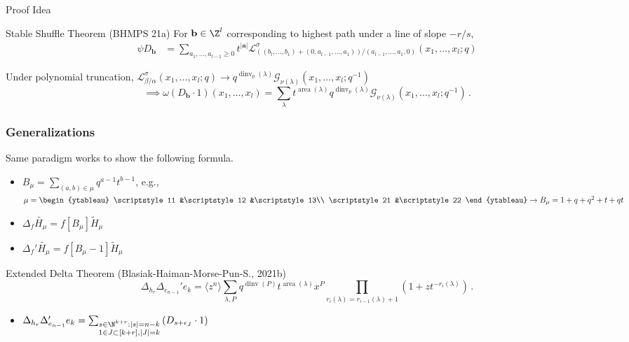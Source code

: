 \documentclass{beamer}
\DeclareMathOperator{\area}{area}
\DeclareMathOperator{\dinv}{dinv}
\newcommand{\Gcal}{\mathcal{G}}
\newcommand{\Lcal}{{\mathcal L}}
\newcommand{\bb}{{\mathbf b}}
\newcommand{\aA}{{\mathbf a}}
\newcounter{c}
\begin{document}
\begin{frame}{Proof Idea}
          \begin{block}{Stable Shuffle Theorem (BHMPS 21a)}
    For \(\bb \in \Z^l\) corresponding to highest path
    under a line of slope \(-r/s\),
    \begin{align*}
      \psi D_\bb &= \sum_{a_1,\ldots,a_{l-1} \geq 0}
t^{|\aA|} \Lcal^\sigma_{((b_l,\ldots,b_1)+(0,a_{l-1},\ldots,a_1))/(a_{l-1},\ldots,a_1,0)}(x_1,\ldots,x_l;q)
    \end{align*}
  \end{block}
    Under polynomial truncation,
  \(\Lcal^\sigma_{\beta/\alpha}(x_1,\ldots,x_l;q) \to
  q^{\dinv_p(\lambda)}\Gcal_{\nu(\lambda)}(x_1,\ldots,x_l;q^{-1})\)\pause \[
    \implies \omega(D_\bb \cdot 1)(x_1,\ldots,x_l) = \sum_\lambda
    t^{\area(\lambda)}q^{\dinv_p(\lambda)} \Gcal_{\nu(\lambda)}(x_1,\ldots,x_l;q^{-1})\,.
  \]
\end{frame}
\begin{frame}
  \frametitle{Generalizations}
  Same paradigm works to show the following formula.\pause
  \begin{itemize}
  \item \(B_\mu = \sum_{(a,b) \in \mu} q^{a-1} t^{b-1}\), e.g., \(\mu
    =
    \begin{ytableau}
      \scriptstyle 11 &\scriptstyle  12 &\scriptstyle  13\\
      \scriptstyle 21 &\scriptstyle  22 
    \end{ytableau}
    \to B_\mu = 1 + q + q^2 + t + qt\)\pause
  \item \(\Delta_f \tilde{H_\mu} = f[B_\mu] \tilde{H}_\mu\)\pause
  \item \(\Delta_f' \tilde{H_\mu} = f[B_\mu-1] \tilde{H}_\mu\)\pause
  \end{itemize}
  \begin{block}{Extended Delta Theorem (Blasiak-Haiman-Morse-Pun-S.,
      2021b)}
    \[\Delta_{h_r} \Delta_{e_{n-1}}' e_k
      = \langle z^n \rangle \sum_{\lambda,P} q^{\dinv(P)}
      t^{\area(\lambda)} x^P \prod_{r_i(\lambda)=r_{i-1}(\lambda)+1}
      (1+zt^{-r_i(\lambda)})\,.\]
  \end{block}\pause
  \begin{itemize}
  \item \(\Delta_{h_r}\Delta_{e_{n-1}}' e_k =  \sum_{\substack{s \in
        \N^{k+r} : |s| = n-k \\ 1 \in J \subset [k+r], |J|=k}}\left( D_{s +
      \epsilon_J} \cdot 1 \right)\)
  \end{itemize}
\end{frame}
\end{document}
